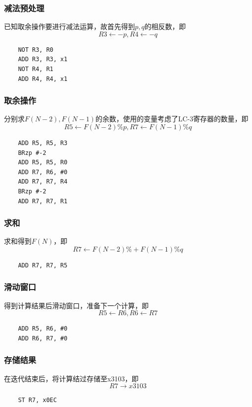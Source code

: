 \documentclass[12pt, a4paper, oneside]{ctexart}
\begin{document}
\subsubsection*{减法预处理}
已知取余操作要进行减法运算，故首先得到$p,q$的相反数，即$$R3 \leftarrow -p, R4 \leftarrow -q$$
\begin{lstlisting}
    NOT R3, R0
    ADD R3, R3, x1
    NOT R4, R1
    ADD R4, R4, x1
\end{lstlisting}
\subsubsection*{取余操作}
分别求$F(N-2),F(N-1)$的余数，使用的变量考虑了LC-3寄存器的数量，即
$$R5 \leftarrow F(N-2) \% p, R7 \leftarrow F(N-1) \% q$$
\begin{lstlisting}
    ADD R5, R5, R3 
    BRzp #-2
    ADD R5, R5, R0
    ADD R7, R6, #0
    ADD R7, R7, R4
    BRzp #-2
    ADD R7, R7, R1
\end{lstlisting}
\subsubsection*{求和}
求和得到$F(N)$，即
$$R7 \leftarrow F(N-2) \% + F(N-1) \% q$$
\begin{lstlisting}
    ADD R7, R7, R5
\end{lstlisting}
\subsubsection*{滑动窗口}
得到计算结果后滑动窗口，准备下一个计算，即
$$R5 \leftarrow R6, R6 \leftarrow R7$$
\begin{lstlisting}
    ADD R5, R6, #0
    ADD R6, R7, #0
\end{lstlisting}
\subsubsection*{存储结果}
在迭代结束后，将计算结过存储至x3103，即
$$R7 \rightarrow x3103$$
\begin{lstlisting}
    ST R7, x0EC
\end{lstlisting}
\end{document}
